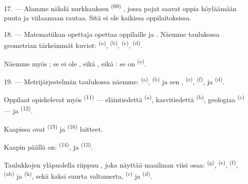 17. --- Alamme nähdä nurkkauksen  \textsuperscript{(69)}
, jossa pojat saavat oppia höyläämään puuta ja viilaamaan
rautaa. Sitä ei ole kaikissa oppilaitoksissa.

\VUsaut{5.0mm}
\VUsaut{3.6mm}

18. --- Matematiikan opettaja opettaa oppilaille  ja . Näemme taulukossa
geometrian tärkeimmät kuviot:  \textsuperscript{(a)},
 \textsuperscript{(b)}, 
\textsuperscript{(c)},  \textsuperscript{(d)}.

Näemme myös ; se ei ole , eikä
, eikä : se on 
\textsuperscript{(e)}.

19. --- Metrijärjestelmän taulukossa näemme: 
\textsuperscript{(a)},  \textsuperscript{(b)} ja sen
,  \textsuperscript{(e)},
 \textsuperscript{(f)},  ja
 \textsuperscript{(d)}.

Oppilaat opiskelevat myös  \textsuperscript{(11)} ---
eläintiedettä \textsuperscript{(a)}, kasvitiedettä \textsuperscript{(b)},
geologiaa \textsuperscript{(c)} --- ja 
\textsuperscript{(12)}.

Kaapissa ovat  \textsuperscript{(15)} ja 
\textsuperscript{(16)} laitteet.

Kaapin päällä on:  \textsuperscript{(14)},  ja
 \textsuperscript{(13)}.

Taulukkojen yläpuolella riippuu , joka näyttää maailman viisi
osaa:  \textsuperscript{(g)}, 
\textsuperscript{(e)},  \textsuperscript{(f)},
 \textsuperscript{(ab)} ja 
\textsuperscript{(h)}, sekä kaksi suurta valtamerta, 
\textsuperscript{(c)} ja  \textsuperscript{(d)}.
\VUsaut{6.0mm}
\VUfilet{22mm}
